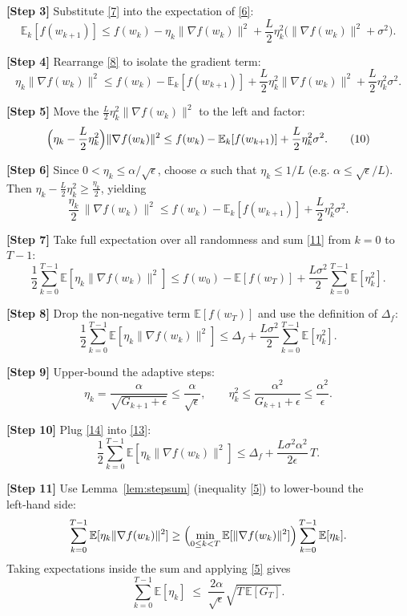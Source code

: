 \documentclass{article}
\newcommand{\E}{\mathbb{E}}
\begin{document}
\noindent\textbf{[Step 3]} Substitute \eqref{7} into the expectation of \eqref{6}:
\[
\E_{k}[f(w_{k+1})] \le f(w_k)
- \eta_k\|\nabla f(w_k)\|^{2}
+ \frac{L}{2}\eta_k^{2}\bigl(\|\nabla f(w_k)\|^{2}+\sigma^{2}\bigr). \tag{8}
\]

\noindent\textbf{[Step 4]} Rearrange \eqref{8} to isolate the gradient term:
\[
\eta_k\|\nabla f(w_k)\|^{2}
\le f(w_k)-\E_{k}[f(w_{k+1})]
+ \frac{L}{2}\eta_k^{2}\|\nabla f(w_k)\|^{2}
+ \frac{L}{2}\eta_k^{2}\sigma^{2}. \tag{9}
\]

\noindent\textbf{[Step 5]} Move the $\frac{L}{2}\eta_k^{2}\|\nabla f(w_k)\|^{2}$ to the left
and factor:
\[
\Bigl(\eta_k-\frac{L}{2}\eta_k^{2}\Bigr)\|\nabla f(w_k)\|^{2}
\le f(w_k)-\E_{k}[f(w_{k+1})] + \frac{L}{2}\eta_k^{2}\sigma^{2}. \tag{10}
\]

\noindent\textbf{[Step 6]} Since $0<\eta_k\le \alpha/\sqrt{\epsilon}$,
choose $\alpha$ such that $\eta_k\le 1/L$ (e.g. $\alpha\le \sqrt{\epsilon}/L$).  
Then $\eta_k-\frac{L}{2}\eta_k^{2}\ge \frac{\eta_k}{2}$, yielding
\[
\frac{\eta_k}{2}\,\|\nabla f(w_k)\|^{2}
\le f(w_k)-\E_{k}[f(w_{k+1})] + \frac{L}{2}\eta_k^{2}\sigma^{2}. \tag{11}
\]

\noindent\textbf{[Step 7]} Take full expectation over all randomness and sum
\eqref{11} from $k=0$ to $T-1$:
\[
\frac{1}{2}\sum_{k=0}^{T-1}\E[\eta_k\|\nabla f(w_k)\|^{2}]
\le f(w_0)-\E[f(w_T)] + \frac{L\sigma^{2}}{2}\sum_{k=0}^{T-1}\E[\eta_k^{2}].
\tag{12}
\]

\noindent\textbf{[Step 8]} Drop the non‑negative term $\E[f(w_T)]$ and use the
definition of $\Delta_f$:
\[
\frac{1}{2}\sum_{k=0}^{T-1}\E[\eta_k\|\nabla f(w_k)\|^{2}]
\le \Delta_f + \frac{L\sigma^{2}}{2}\sum_{k=0}^{T-1}\E[\eta_k^{2}]. \tag{13}
\]

\noindent\textbf{[Step 9]} Upper‑bound the adaptive steps:
\[
\eta_k = \frac{\alpha}{\sqrt{G_{k+1}+\epsilon}}\le \frac{\alpha}{\sqrt{\epsilon}},
\qquad
\eta_k^{2}\le \frac{\alpha^{2}}{G_{k+1}+\epsilon}
\le \frac{\alpha^{2}}{\epsilon}. \tag{14}
\]

\noindent\textbf{[Step 10]} Plug \eqref{14} into \eqref{13}:
\[
\frac{1}{2}\sum_{k=0}^{T-1}\E[\eta_k\|\nabla f(w_k)\|^{2}]
\le \Delta_f + \frac{L\sigma^{2}\alpha^{2}}{2\epsilon}\,T. \tag{15}
\]

\noindent\textbf{[Step 11]} Use Lemma~\ref{lem:stepsum} (inequality \eqref{5}) to lower‑bound the left‑hand side:
\[
\sum_{k=0}^{T-1}\E[\eta_k\|\nabla f(w_k)\|^{2}]
\ge
\Bigl(\min_{0\le k<T}\E[\|\nabla f(w_k)\|^{2}]\Bigr)
\sum_{k=0}^{T-1}\E[\eta_k].
\]
Taking expectations inside the sum and applying \eqref{5} gives
\[
\sum_{k=0}^{T-1}\E[\eta_k]\;\le\;
\frac{2\alpha}{\sqrt{\epsilon}}\sqrt{T\,\E[G_T] } .
\tag{16}
\]
\end{document}
